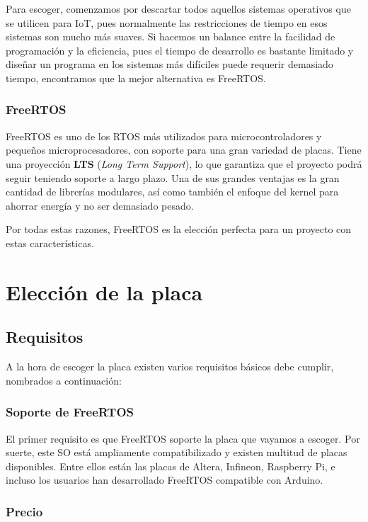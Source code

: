 Para escoger, comenzamos por descartar todos aquellos sistemas operativos que se utilicen para IoT, pues normalmente las restricciones de tiempo en esos sistemas son mucho más suaves. Si hacemos un balance entre la facilidad de programación y la eficiencia, pues el tiempo de desarrollo es bastante limitado y diseñar un programa en los sistemas más difíciles puede requerir demasiado tiempo, encontramos que la mejor alternativa es FreeRTOS. 

\subsubsection{FreeRTOS}

FreeRTOS es uno de los RTOS más utilizados para microcontroladores y pequeños microprocesadores, con soporte para una gran variedad de placas\cite{freertos}. Tiene una proyección \textbf{LTS} (\textit{Long Term Support}), lo que garantiza que el proyecto podrá seguir teniendo soporte a largo plazo. Una de sus grandes ventajas es la gran cantidad de librerías modulares, así como también el enfoque del kernel para ahorrar energía y no ser demasiado pesado. 

Por todas estas razones, FreeRTOS es la elección perfecta para un proyecto con estas características. 

\section{Elección de la placa}
\subsection{Requisitos}
A la hora de escoger la placa existen varios requisitos básicos debe cumplir, nombrados a continuación: 

\subsubsection{Soporte de FreeRTOS}

El primer requisito es que FreeRTOS soporte la placa que vayamos a escoger. Por suerte, este SO está ampliamente compatibilizado y existen multitud de placas disponibles\cite{freertos_comp}. Entre ellos están las placas de Altera, Infineon, Raspberry Pi, e incluso los usuarios han desarrollado FreeRTOS compatible con Arduino.

\subsubsection{Precio}

